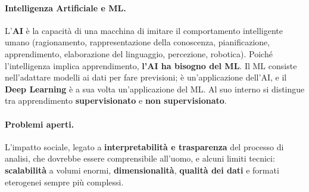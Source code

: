 \paragraph*{Intelligenza Artificiale e ML.}
L'\textbf{AI} è la capacità di una macchina di imitare il comportamento intelligente umano (ragionamento, rappresentazione della conoscenza, pianificazione, apprendimento, elaborazione del linguaggio, percezione, robotica). Poiché l'intelligenza implica apprendimento, \textbf{l'AI ha bisogno del ML}. Il ML consiste nell'adattare modelli ai dati per fare previsioni; è un'applicazione dell'AI, e il \textbf{Deep Learning} è a sua volta un'applicazione del ML. Al suo interno si distingue tra apprendimento \textbf{supervisionato} e \textbf{non supervisionato}.

\paragraph*{Problemi aperti.}
L'impatto sociale, legato a \textbf{interpretabilità e trasparenza} del processo di analisi, che dovrebbe essere comprensibile all'uomo, e alcuni limiti tecnici: \textbf{scalabilità} a volumi enormi, \textbf{dimensionalità}, \textbf{qualità dei dati} e formati eterogenei sempre più complessi.